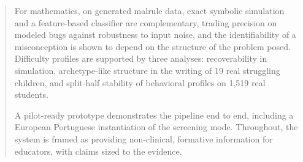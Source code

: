 \begin{abstract}
For mathematics, on generated malrule data, exact symbolic simulation and a feature-based classifier are complementary, trading precision on modeled bugs against robustness to input noise, and the identifiability of a misconception is shown to depend on the structure of the problem posed. Difficulty profiles are supported by three analyses: recoverability in simulation, archetype-like structure in the writing of 19 real struggling children, and split-half stability of behavioral profiles on 1{,}519 real students.

A pilot-ready prototype demonstrates the pipeline end to end, including a European Portuguese instantiation of the screening mode. Throughout, the system is framed as providing non-clinical, formative information for educators, with claims sized to the evidence.

\end{abstract}

